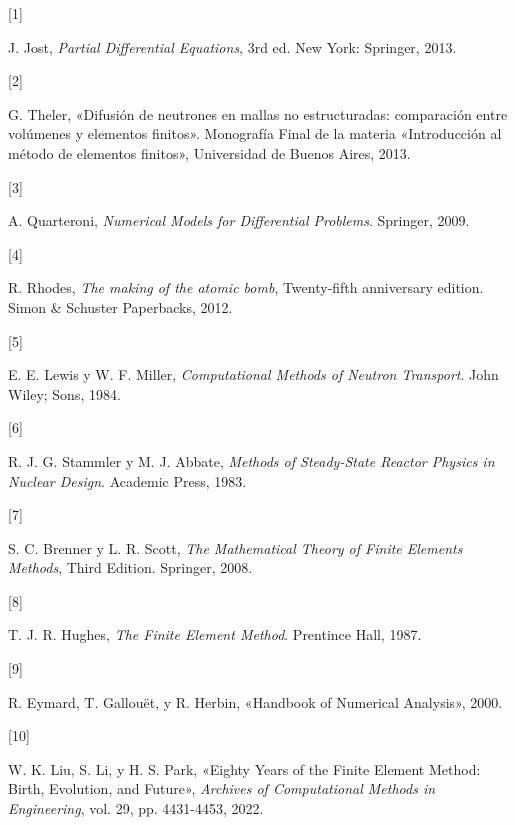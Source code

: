 \documentclass[
  12pt,
  a4paper,
  table]{scrbook}
\newlength{\cslhangindent}
\newlength{\csllabelwidth}
\newlength{\cslentryspacingunit} %
\newenvironment{CSLReferences}[2] %
 {%
  \setlength{\parindent}{0pt}
  \ifodd #1
  \let\oldpar\par
  \def\par{\hangindent=\cslhangindent\oldpar}
  \fi
  \setlength{\parskip}{#2\cslentryspacingunit}
 }%
 {}
\newcommand{\CSLLeftMargin}[1]{\parbox[t]{\csllabelwidth}{#1}}
\newcommand{\CSLRightInline}[1]{\parbox[t]{\linewidth - \csllabelwidth}{#1}\break}
\theoremstyle{plain}
\theoremstyle{definition}
\theoremstyle{plain}
\theoremstyle{plain}
\theoremstyle{remark}
\begin{document}
\hypertarget{refs}{}
\begin{CSLReferences}{0}{0}
\leavevmode{}%
\CSLLeftMargin{{[}1{]} }%
\CSLRightInline{J. Jost, \emph{Partial Differential Equations}, 3rd ed.
New York: Springer, 2013.}

\leavevmode{}%
\CSLLeftMargin{{[}2{]} }%
\CSLRightInline{G. Theler, {«Difusión de neutrones en mallas no
estructuradas: comparación entre volúmenes y elementos finitos»}.
Monografía Final de la materia {«Introducción al método de elementos
finitos»}, Universidad de Buenos Aires, 2013.}

\leavevmode{}%
\CSLLeftMargin{{[}3{]} }%
\CSLRightInline{A. Quarteroni, \emph{Numerical Models for Differential
Problems}. Springer, 2009.}

\leavevmode{}%
\CSLLeftMargin{{[}4{]} }%
\CSLRightInline{R. Rhodes, \emph{The making of the atomic bomb},
Twenty-fifth anniversary edition. Simon \& Schuster Paperbacks, 2012.}

\leavevmode{}%
\CSLLeftMargin{{[}5{]} }%
\CSLRightInline{E. E. Lewis y W. F. Miller, \emph{Computational Methods
of Neutron Transport}. John Wiley; Sons, 1984.}

\leavevmode{}%
\CSLLeftMargin{{[}6{]} }%
\CSLRightInline{R. J. G. Stammler y M. J. Abbate, \emph{Methods of
Steady-State Reactor Physics in Nuclear Design}. Academic Press, 1983.}

\leavevmode{}%
\CSLLeftMargin{{[}7{]} }%
\CSLRightInline{S. C. Brenner y L. R. Scott, \emph{The Mathematical
Theory of Finite Elements Methods}, Third Edition. Springer, 2008.}

\leavevmode{}%
\CSLLeftMargin{{[}8{]} }%
\CSLRightInline{T. J. R. Hughes, \emph{The Finite Element Method}.
Prentince Hall, 1987.}

\leavevmode{}%
\CSLLeftMargin{{[}9{]} }%
\CSLRightInline{R. Eymard, T. Gallouët, y R. Herbin, {«Handbook of
Numerical Analysis»}, 2000.}

\leavevmode{}%
\CSLLeftMargin{{[}10{]} }%
\CSLRightInline{W. K. Liu, S. Li, y H. S. Park, {«Eighty Years of the
Finite Element Method: Birth, Evolution, and Future»}, \emph{Archives of
Computational Methods in Engineering}, vol. 29, pp. 4431-4453, 2022.}


\end{CSLReferences}
\end{document}
